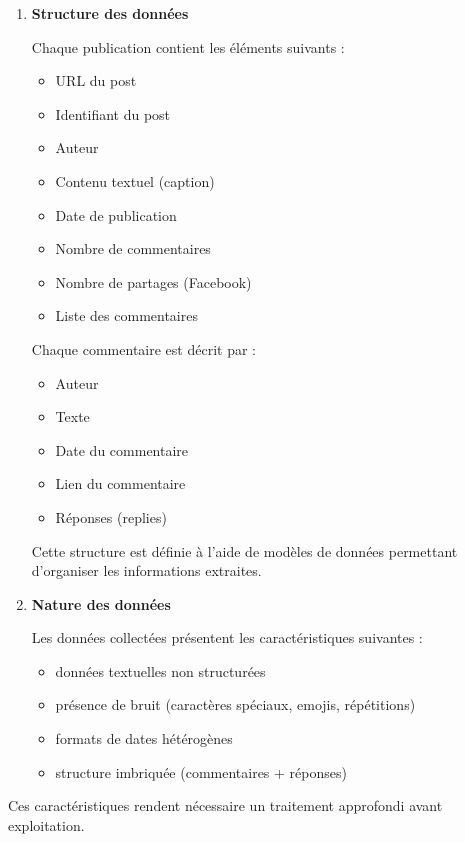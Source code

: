 \documentclass[12pt,a4paper,oneside]{report}
\begin{document}
\begin{enumerate}
    \item \textbf{Structure des données}

    Chaque publication contient les éléments suivants :
    
    \begin{itemize}
        \item URL du post
        \item Identifiant du post
        \item Auteur
        \item Contenu textuel (caption)
        \item Date de publication
        \item Nombre de commentaires
        \item Nombre de partages (Facebook)
        \item Liste des commentaires
    \end{itemize}
    Chaque commentaire est décrit par :
    \begin{itemize}
        \item Auteur
        \item Texte
        \item Date du commentaire
        \item Lien du commentaire
        \item Réponses (replies)
    \end{itemize}
    Cette structure est définie à l’aide de modèles de données permettant d’organiser les informations extraites.
    
    \item \textbf{Nature des données}
    
    Les données collectées présentent les caractéristiques suivantes :
    
    \begin{itemize}
        \item données textuelles non structurées
        \item présence de bruit (caractères spéciaux, emojis, répétitions)
        \item formats de dates hétérogènes
        \item structure imbriquée (commentaires + réponses)
    \end{itemize}
\end{enumerate}

Ces caractéristiques rendent nécessaire un traitement approfondi avant exploitation.
\end{document}
